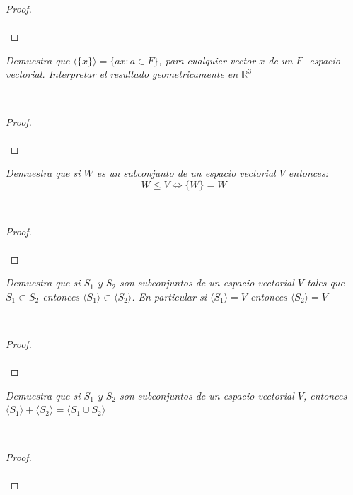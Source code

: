 \documentclass[11pt,letterpaper]{article}
\newcommand{\R}{\mathbb{R}}
\begin{document}
\begin{proof}\,\\
    \,\\
\end{proof}
\begin{tcolorbox}[
	title = \textcolor{black}{\textcolor{white}{Problema 4}},]
\textit{Demuestra que $\langle\{x\}\rangle=\{ax:a\in F\}$, para cualquier vector $x$ de un $F$- espacio vectorial. Interpretar el resultado geometricamente en $\R^3$
}
\end{tcolorbox}\,\\
\begin{proof}\,\\
    \,\\
\end{proof}
\begin{tcolorbox}[
	title = \textcolor{black}{\textcolor{white}{Problema 5}},]
\textit{Demuestra que si $W$ es un subconjunto de un espacio vectorial $V$ entonces:\,\\
\begin{equation*}
    W\leq V \iff \{W\}=W 
\end{equation*}
}
\end{tcolorbox}\,\\
\begin{proof}\,\\
    \,\\
\end{proof}
\begin{tcolorbox}[
	title = \textcolor{black}{\textcolor{white}{Problema 6}},]
\textit{Demuestra que si $S_1$ y $S_2$ son subconjuntos de un espacio vectorial $V$ tales que $S_1\subset S_2$
entonces $\langle S_1 \rangle \subset \langle S_2 \rangle$. En particular si $\langle S_1 \rangle =V$ entonces $\langle S_2 \rangle =V$
}
\end{tcolorbox}\,\\
\begin{proof}\,\\
    \,\\
\end{proof}
\begin{tcolorbox}[
	title = \textcolor{black}{\textcolor{white}{Problema 7}},]
\textit{Demuestra que si $S_1$ y $S_2$ son subconjuntos de un espacio vectorial $V$, entonces
$\langle S_1 \rangle+ \langle  S_2\rangle=\langle S_1\cup S_2 \rangle  $
}
\end{tcolorbox}\,\\
\begin{proof}\,\\
    \,\\
\end{proof}
\end{document}
